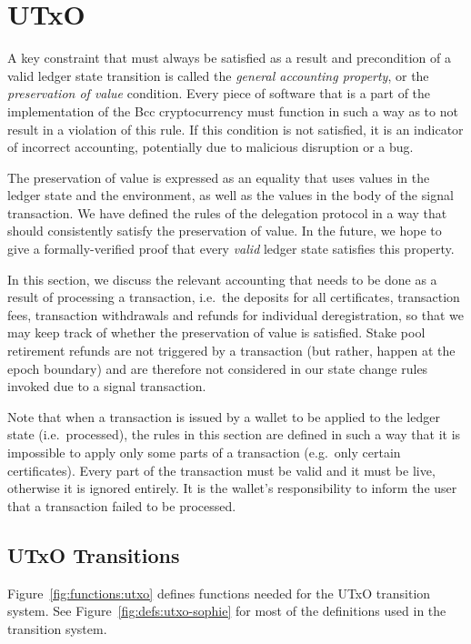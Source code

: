 \section{UTxO}
\label{sec:utxo}

A key constraint that must always be satisfied as a result and precondition of
a valid ledger state transition is called the \textit{general accounting
property}, or the \textit{preservation of value} condition. Every piece of
software that is a part of the implementation of the
Bcc cryptocurrency must function in such a way as to not result in
a violation of this rule.
If this condition is not satisfied, it is an indicator of
incorrect accounting, potentially due to
malicious disruption or a bug.

The preservation of value is expressed as an equality that uses values in
the ledger state and the environment, as well as the values in the body of
the signal transaction.
We have defined the rules of the delegation protocol in a way that should
consistently satisfy the preservation of value. In the future, we hope to
give a formally-verified proof that every \textit{valid} ledger state satisfies
this property.

In this section, we discuss the relevant accounting that needs to be done
as a result of processing a transaction, i.e.~the deposits for all certificates,
transaction fees, transaction withdrawals and refunds for individual
deregistration, so that we may keep track of whether the preservation of
value is satisfied. Stake pool retirement refunds are not triggered by a
transaction (but rather, happen at the epoch boundary) and are therefore
not considered in our state change rules invoked due to a signal transaction.

Note that when a transaction is issued by a wallet to be applied to the ledger
state (i.e.~processed), the rules in this section are defined in such a way that it is impossible to
apply only some parts of a transaction (e.g.~only certain certificates).
Every part of the transaction must be valid and it must be live, otherwise
it is ignored entirely. It is the wallet's responsibility to inform the user
that a transaction failed to be processed.

\subsection{UTxO Transitions}
\label{sec:utxo-trans}

Figure~\ref{fig:functions:utxo} defines functions needed for the UTxO transition system.
See Figure~\ref{fig:defs:utxo-sophie} for most of the definitions used in the transition system.

